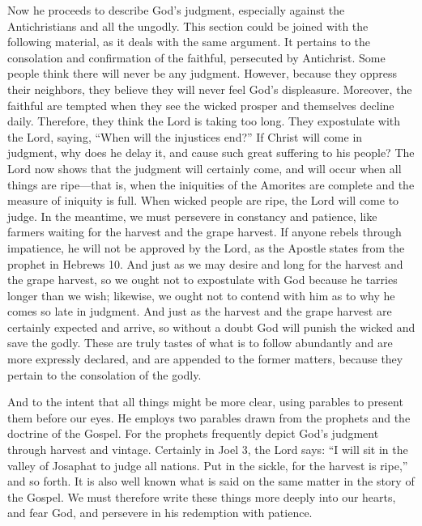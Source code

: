 Now he proceeds to describe God’s judgment, especially against the Antichristians and all the ungodly. This section could be joined with the following material, as it deals with the same argument. It pertains to the consolation and confirmation of the faithful, persecuted by Antichrist. Some people think there will never be any judgment. However, because they oppress their neighbors, they believe they will never feel God’s displeasure. Moreover, the faithful are tempted when they see the wicked prosper and themselves decline daily. Therefore, they think the Lord is taking too long. They expostulate with the Lord, saying, “When will the injustices end?” If Christ will come in judgment, why does he delay it, and cause such great suffering to his people? The Lord now shows that the judgment will certainly come, and will occur when all things are ripe—that is, when the iniquities of the Amorites are complete and the measure of iniquity is full. When wicked people are ripe, the Lord will come to judge. In the meantime, we must persevere in constancy and patience, like farmers waiting for the harvest and the grape harvest. If anyone rebels through impatience, he will not be approved by the Lord, as the Apostle states from the prophet in Hebrews 10. And just as we may desire and long for the harvest and the grape harvest, so we ought not to expostulate with God because he tarries longer than we wish; likewise, we ought not to contend with him as to why he comes so late in judgment. And just as the harvest and the grape harvest are certainly expected and arrive, so without a doubt God will punish the wicked and save the godly. These are truly tastes of what is to follow abundantly and are more expressly declared, and are appended to the former matters, because they pertain to the consolation of the godly.

And to the intent that all things might be more clear, using parables to present them before our eyes. He employs two parables drawn from the prophets and the doctrine of the Gospel. For the prophets frequently depict God’s judgment through harvest and vintage. Certainly in Joel 3, the Lord says: “I will sit in the valley of Josaphat to judge all nations. Put in the sickle, for the harvest is ripe,” and so forth. It is also well known what is said on the same matter in the story of the Gospel. We must therefore write these things more deeply into our hearts, and fear God, and persevere in his redemption with patience.

